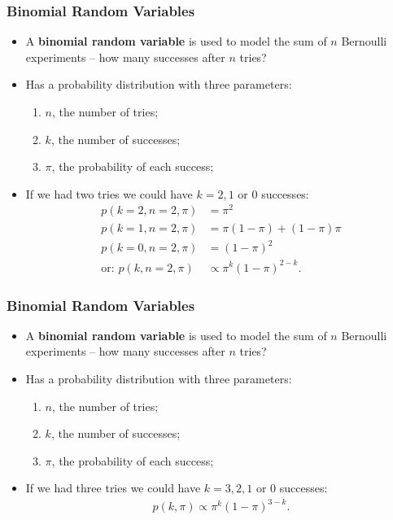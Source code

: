 \documentclass[aspectratio=169]{beamer}
\theoremstyle{principle}
\begin{document}
\begin{frame}
\frametitle{Binomial Random Variables}

\begin{itemize}
\item A \textbf{binomial random variable} is used to model the sum of $n$ Bernoulli experiments -- how many successes after $n$ tries?
\bigskip

\item Has a probability distribution with three parameters:
\begin{enumerate}
\item $n$, the number of tries;
\item $k$, the number of successes;
\item $\pi$, the probability of each success;
\end{enumerate}
\bigskip

\item If we had two tries we could have $k=2,1$ or $0$ successes:
\begin{align*}
p(k = 2,n=2,\pi) & = \pi^2\\
p(k = 1,n=2,\pi) & = \pi(1-\pi) + (1-\pi)\pi\\
p(k = 0,n=2,\pi) & = (1 - \pi)^2\\
\mbox{or: }p(k,n=2,\pi) & \propto \pi^k(1-\pi)^{2-k}.
\end{align*}


\end{itemize}

\end{frame}

\begin{frame}
\frametitle{Binomial Random Variables}

\begin{itemize}
\item A \textbf{binomial random variable} is used to model the sum of $n$ Bernoulli experiments -- how many successes after $n$ tries?
\bigskip

\item Has a probability distribution with three parameters:
\begin{enumerate}
\item $n$, the number of tries;
\item $k$, the number of successes;
\item $\pi$, the probability of each success;
\end{enumerate}
\bigskip

\item If we had three tries we could have $k=3,2,1$ or $0$ successes:
\begin{align*}
p(k,\pi) \propto \pi^k(1-\pi)^{3-k}.
\end{align*}

\end{itemize}

\end{frame}
\end{document}
